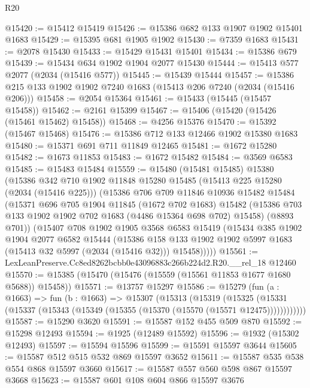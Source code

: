 \begin{lexlean}{R20}
\begin{coremodule}
@15420 := @15412 @15419
@15426 := @15386 @682 @133 @1907 @1902 @15401 @1683
@15429 := @15395 @681 @1905 @1902
@15430 := @7359 @1683
@15431 := @2078 @15430
@15433 := @15429 @15431 @15401
@15434 := @15386 @679
@15439 := @15434 @634 @1902 @1904 @2077 @15430
@15444 := @15413 @577 @2077 (@2034 (@15416 @577))
@15445 := @15439 @15444
@15457 := @15386 @215 @133 @1902 @1902 @7240 @1683 (@15413 @206 @7240 (@2034 (@15416 @206)))
@15458 := @2054 @15364
@15461 := @15433 (@15445 (@15457 @15458))
@15462 := @2161 @15399
@15467 := @15406 (@15420 (@15426 (@15461 @15462) @15458))
@15468 := @4256 @15376
@15470 := @15392 (@15467 @15468)
@15476 := @15386 @712 @133 @12466 @1902 @15380 @1683
@15480 := @15371 @691 @711 @11849 @12465
@15481 := @1672 @15280
@15482 := @1673 @11853
@15483 := @1672 @15482
@15484 := @3569 @6583
@15485 := @15483 @15484
@15559 := @15480
    (@15481 @15485)
    @15380
    (@15386
      @342
      @710
      @1902
      @11848
      @15280
      @15485
      (@15413 @225 @15280 (@2034 (@15416 @225)))
      (@15386
        @706
        @709
        @11846
        @10936
        @15482
        @15484
        (@15371
          @696
          @705
          @1904
          @11845
          (@1672 @702 @1683)
          @15482
          (@15386 @703 @133 @1902 @1902 @702 @1683 (@4486 @15364 @698 @702) @15458)
          (@8893 @701))
        (@15407
          @708
          @1902
          @1905
          @3568
          @6583
          @15419
          (@15434
            @385
            @1902
            @1904
            @2077
            @6582
            @15444
            (@15386
              @158
              @133
              @1902
              @1902
              @5997
              @1683
              (@15413 @32 @5997 (@2034 (@15416 @32)))
              @15458)))))
@15561 := LexLeanPreserve.Cc8ed8262bcbb0e43096883c266b224d2.R20.__rel_18 @12460
@15570 := @15385 (@15470 (@15476 (@15559 (@15561 @11853 @1677 @1680 @5688)) @15458))
@15571 := @13757 @15297
@15586 := @15279
    (fun (a : @1663) =>
    fun (b : @1663) =>
    @15307
      (@15313
        (@15319
          (@15325 (@15331 (@15337 (@15343 (@15349 (@15355 (@15370 (@15570 (@15571 @12475))))))))))))
@15587 := @15290 @3620
@15591 := @15587 @152 @455 @509 @870
@15592 := @15298 @12493
@15594 := @1925 (@12489 @15592)
@15596 := @1932 (@15302 @12493)
@15597 := @15594 @15596
@15599 := @15591 @15597 @3644
@15605 := @15587 @512 @515 @532 @869 @15597 @3652
@15611 := @15587 @535 @538 @554 @868 @15597 @3660
@15617 := @15587 @557 @560 @598 @867 @15597 @3668
@15623 := @15587 @601 @108 @604 @866 @15597 @3676

\end{coremodule}
\end{lexlean}
